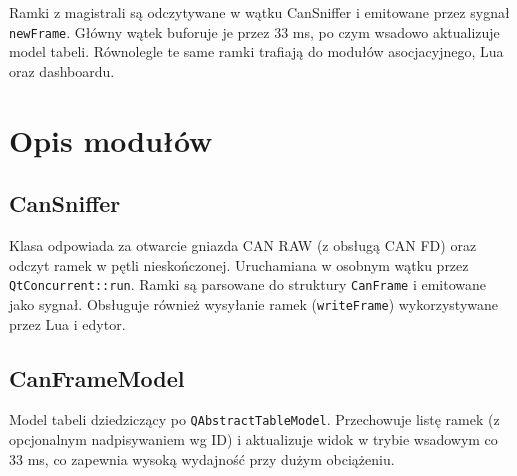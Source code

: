 \documentclass[a4paper,12pt,polish]{article}
\begin{document}
Ramki z magistrali są odczytywane w wątku CanSniffer i emitowane przez sygnał \texttt{newFrame}. Główny wątek buforuje je przez 33 ms, po czym wsadowo aktualizuje model tabeli. Równolegle te same ramki trafiają do modułów asocjacyjnego, Lua oraz dashboardu.

\section{Opis modułów}
\label{sec:modules}

\subsection{CanSniffer}
Klasa odpowiada za otwarcie gniazda CAN RAW (z obsługą CAN FD) oraz odczyt ramek w pętli nieskończonej. Uruchamiana w osobnym wątku przez \texttt{QtConcurrent::run}. Ramki są parsowane do struktury \texttt{CanFrame} i emitowane jako sygnał. Obsługuje również wysyłanie ramek (\texttt{writeFrame}) wykorzystywane przez Lua i edytor.

\subsection{CanFrameModel}
Model tabeli dziedziczący po \texttt{QAbstractTableModel}. Przechowuje listę ramek (z opcjonalnym nadpisywaniem wg ID) i aktualizuje widok w trybie wsadowym co 33 ms, co zapewnia wysoką wydajność przy dużym obciążeniu.
\end{document}
